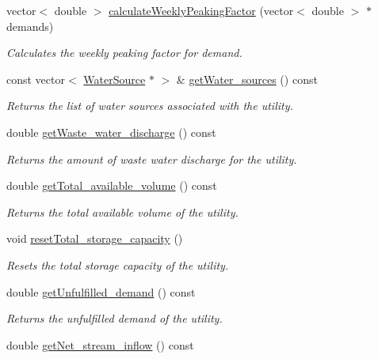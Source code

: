 \begin{DoxyCompactItemize}
vector$<$ double $>$ \mbox{\hyperlink{classUtility_a54c8621f2cce5257343f8dc6bfd76cff}{calculate\+Weekly\+Peaking\+Factor}} (vector$<$ double $>$ $\ast$demands)
\begin{DoxyCompactList}\small\item\em Calculates the weekly peaking factor for demand. \end{DoxyCompactList}\item 
const vector$<$ \mbox{\hyperlink{classWaterSource}{Water\+Source}} $\ast$ $>$ \& \mbox{\hyperlink{classUtility_af68f63148aa901e781b939c8aa3699af}{get\+Water\+\_\+sources}} () const
\begin{DoxyCompactList}\small\item\em Returns the list of water sources associated with the utility. \end{DoxyCompactList}\item 
double \mbox{\hyperlink{classUtility_a68dc298c3078ff450cdc7b6a69422da1}{get\+Waste\+\_\+water\+\_\+discharge}} () const
\begin{DoxyCompactList}\small\item\em Returns the amount of waste water discharge for the utility. \end{DoxyCompactList}\item 
double \mbox{\hyperlink{classUtility_a6128e9ac10cc873773112593b5788d81}{get\+Total\+\_\+available\+\_\+volume}} () const
\begin{DoxyCompactList}\small\item\em Returns the total available volume of the utility. \end{DoxyCompactList}\item 
void \mbox{\hyperlink{classUtility_a0ac180e13fb963a29c2860664c3f352a}{reset\+Total\+\_\+storage\+\_\+capacity}} ()
\begin{DoxyCompactList}\small\item\em Resets the total storage capacity of the utility. \end{DoxyCompactList}\item 
double \mbox{\hyperlink{classUtility_a062fd9a622bd9893c142ae56523010dd}{get\+Unfulfilled\+\_\+demand}} () const
\begin{DoxyCompactList}\small\item\em Returns the unfulfilled demand of the utility. \end{DoxyCompactList}\item 
double \mbox{\hyperlink{classUtility_a93d865d309801d2b44687b2e14620386}{get\+Net\+\_\+stream\+\_\+inflow}} () const

\end{DoxyCompactItemize}
